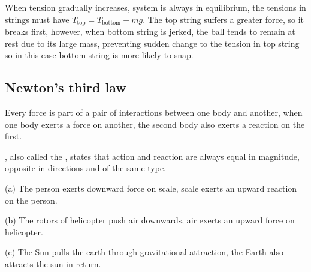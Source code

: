 	
\begin{soln}
When tension gradually increases, system is always in equilibrium, the tensions in strings must have $T_\text{top} = T_\text{bottom} + mg$. The top string suffers a greater force, so it breaks first, however, when bottom string is jerked, the ball tends to remain at rest due to its large mass, preventing sudden change to the tension in top string so in this case bottom string is more likely to snap.
\end{soln}


\subsection{Newton's third law}

Every force is part of a pair of interactions between one body and another, when one body exerts a force on another, the second body also exerts a reaction on the first.

\begin{ilight}
	, also called the , states that action and reaction are always equal in magnitude, opposite in directions and of the same type.
\end{ilight}


\begin{soln}(a) The person exerts downward force on scale, scale exerts an upward reaction on the person.

(b) The rotors of helicopter push air downwards, air exerts an upward force on helicopter.

(c) The Sun pulls the earth through gravitational attraction, the Earth also attracts the sun in return. \end{soln}


